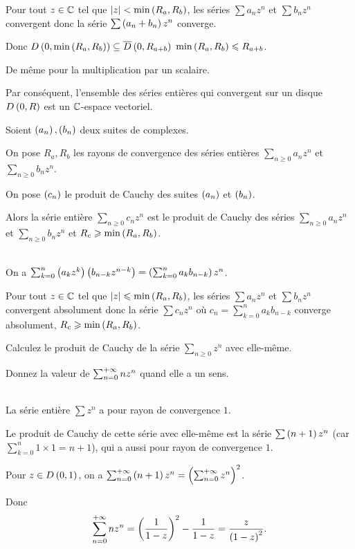 \begin{dem}
Pour tout \(z\in\mathbb{C}\) tel que \(\left\lvert z\right\rvert<\min\left(R_a,R_b\right)\), les séries \(\sum a_nz^n\) et \(\sum b_nz^n\) convergent donc la série \(\sum\left(a_n+b_n\right)z^n\) converge.

Donc \(\disqueo{0}{\min\paren{R_a,R_b}}\subset\disquef{0}{R_{a+b}}\) \ie \(\min\left(R_a,R_b\right)\leqslant R_{a+b}\).

De même pour la multiplication par un scalaire.
\end{dem}

Par conséquent, l'ensemble des séries entières qui convergent sur un disque \(\disqueo{0}{R}\) est un \(\mathbb{C}\)-espace vectoriel.

\begin{prop}
Soient \(\left(a_n\right),\left(b_n\right)\) deux suites de complexes.

On pose \(R_a,R_b\) les rayons de convergence des séries entières \(\sum_{n\geq0}a_nz^n\) et \(\sum_{n\geq0}b_nz^n\).

On pose \(\left(c_n\right)\) le produit de Cauchy des suites \(\left(a_n\right)\) et \(\left(b_n\right)\).

Alors la série entière \(\sum_{n\geq0}c_nz^n\) est le produit de Cauchy des séries \(\sum_{n\geq0}a_nz^n\) et \(\sum_{n\geq0}b_nz^n\) et \(R_c\geqslant\min\left(R_a,R_b\right)\).
\end{prop}

\begin{dem}~\\
On a \(\sum_{k=0}^n\left(a_kz^k\right)\left(b_{n-k}z^{n-k}\right)=\left(\sum_{k=0}^na_kb_{n-k}\right)z^n\).

Pour tout \(z\in\mathbb{C}\) tel que \(\left\lvert z\right\rvert\leqslant\min\left(R_a,R_b\right)\), les séries \(\sum a_nz^n\) et \(\sum b_nz^n\) convergent absolument donc la série \(\sum c_nz^n\) où \(c_n=\sum_{k=0}^na_kb_{n-k}\) converge absolument, \ie \(R_c\geqslant\min\left(R_a,R_b\right)\).
\end{dem}

\begin{exo}
Calculez le produit de Cauchy de la série \(\sum_{n\geq0}z^n\) avec elle-même.

Donnez la valeur de \(\sum_{n=0}^{+\infty}nz^n\) quand elle a un sens.
\end{exo}

\begin{corr}~\\
La série entière \(\sum z^n\) a pour rayon de convergence \(1\).

Le produit de Cauchy de cette série avec elle-même est la série \(\sum\left(n+1\right)z^n\) (car \(\sum_{k=0}^n1\times1=n+1\)), qui a aussi pour rayon de convergence \(1\).

Pour \(z\in\disqueo{0}{1}\), on a \(\sum_{n=0}^{+\infty}\left(n+1\right)z^n=\left(\sum_{n=0}^{+\infty}z^n\right)^2\).

Donc \[\sum_{n=0}^{+\infty}nz^n=\left(\dfrac{1}{1-z}\right)^2-\dfrac{1}{1-z}=\dfrac{z}{\left(1-z\right)^2}.\]
\end{corr}

